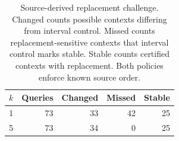 \begin{table}[t]
\centering
\small
\setlength{\tabcolsep}{5pt}
\begin{tabular}{rrrrr}
\toprule
$k$ & Queries & Changed & Missed & Stable \\
\midrule
1 & 73 & 33 & 42 & 25 \\
5 & 73 & 34 & 0 & 25 \\
\bottomrule
\end{tabular}
\caption{Source-derived replacement challenge. Changed counts possible contexts differing from interval control. Missed counts replacement-sensitive contexts that interval control marks stable. Stable counts certified contexts with replacement. Both policies enforce known source order.}
\label{tab:replacement}
\end{table}
